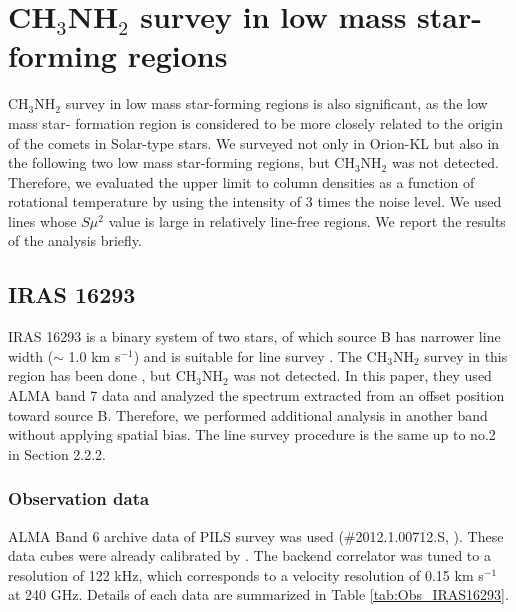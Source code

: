 \chapter{CH$_{3}$NH$_{2}$ survey in low mass star-forming regions
\label{chap:appendixA}}

CH$_{3}$NH$_{2}$ survey in low mass star-forming regions is also significant, 
as the low mass star- formation region is considered to be more closely related to the origin of the comets in Solar-type stars. 
We surveyed not only in Orion-KL but also in the following two low mass star-forming regions, 
but CH$_{3}$NH$_{2}$ was not detected.  
Therefore, we evaluated the upper limit to column densities as a function of rotational temperature 
by using the intensity of 3 times the noise level. 
We used lines whose $S\mu^2$ value is large  in relatively line-free regions.
We report the results of the analysis briefly.

\section{IRAS 16293}
IRAS 16293 is a binary system of two stars, of which source B has narrower line width 
($\sim$ 1.0 km s$^{-1}$) and is suitable for line survey \citep{Persson+2018}. 
The CH$_{3}$NH$_{2}$ survey in this region has been done \citep{Ligterink+2018}, 
but CH$_{3}$NH$_{2}$ was not detected.
In this paper, they used ALMA  band 7 data and analyzed the spectrum extracted from an offset position toward source B.
Therefore, we performed additional analysis in another band without applying spatial bias. 
The line survey procedure is the same up to no.2 in Section 2.2.2.

\subsection{Observation data}
ALMA Band 6 archive data of PILS survey was used (\#2012.1.00712.S, \citet{Jorgensen+2016}).
These data cubes were already calibrated by \citet{Oya+2016}.  
The backend correlator was tuned to a resolution of 122 kHz, which corresponds to a
velocity resolution of 0.15 km s$^{-1}$ at 240 GHz.
Details of each data are summarized in Table \ref{tab:Obs_IRAS16293}.

